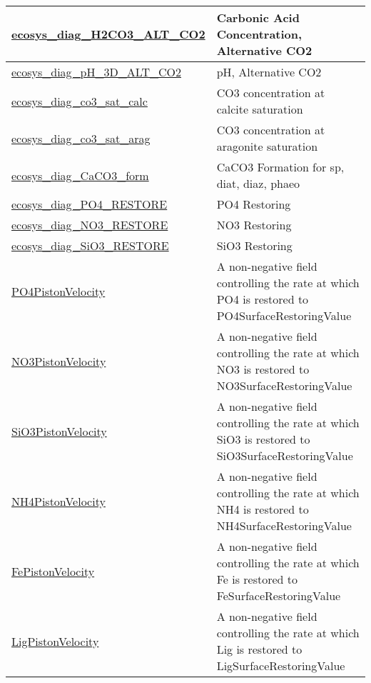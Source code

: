 {\begin{center}
\begin{longtable}{| p{2.0in} | p{4.0in} |}
    \hline
    \hyperref[subsec:var_sec_forcing_ecosys_diag_H2CO3_ALT_CO2]{ecosys\_diag\_H2CO3\_ALT\_\-CO2} & Carbonic Acid Concentration, Alternative CO2 \\
    \hline
    \hyperref[subsec:var_sec_forcing_ecosys_diag_pH_3D_ALT_CO2]{ecosys\_diag\_pH\_3D\_ALT\_\-CO2} & pH, Alternative CO2 \\
    \hline
    \hyperref[subsec:var_sec_forcing_ecosys_diag_co3_sat_calc]{ecosys\_diag\_co3\_sat\_calc} & CO3 concentration at calcite saturation \\
    \hline
    \hyperref[subsec:var_sec_forcing_ecosys_diag_co3_sat_arag]{ecosys\_diag\_co3\_sat\_arag} & CO3 concentration at aragonite saturation \\
    \hline
    \hyperref[subsec:var_sec_forcing_ecosys_diag_CaCO3_form]{ecosys\_diag\_CaCO3\_form} & CaCO3 Formation for sp, diat, diaz, phaeo \\
    \hline
    \hyperref[subsec:var_sec_forcing_ecosys_diag_PO4_RESTORE]{ecosys\_diag\_PO4\_RESTORE} & PO4 Restoring \\
    \hline
    \hyperref[subsec:var_sec_forcing_ecosys_diag_NO3_RESTORE]{ecosys\_diag\_NO3\_RESTORE} & NO3 Restoring \\
    \hline
    \hyperref[subsec:var_sec_forcing_ecosys_diag_SiO3_RESTORE]{ecosys\_diag\_SiO3\_RESTORE} & SiO3 Restoring \\
    \hline
    \hyperref[subsec:var_sec_forcing_PO4PistonVelocity]{PO4PistonVelocity} & A non-negative field controlling the rate at which PO4 is restored to PO4SurfaceRestoringValue \\
    \hline
    \hyperref[subsec:var_sec_forcing_NO3PistonVelocity]{NO3PistonVelocity} & A non-negative field controlling the rate at which NO3 is restored to NO3SurfaceRestoringValue \\
    \hline
    \hyperref[subsec:var_sec_forcing_SiO3PistonVelocity]{SiO3PistonVelocity} & A non-negative field controlling the rate at which SiO3 is restored to SiO3SurfaceRestoringValue \\
    \hline
    \hyperref[subsec:var_sec_forcing_NH4PistonVelocity]{NH4PistonVelocity} & A non-negative field controlling the rate at which NH4 is restored to NH4SurfaceRestoringValue \\
    \hline
    \hyperref[subsec:var_sec_forcing_FePistonVelocity]{FePistonVelocity} & A non-negative field controlling the rate at which Fe is restored to FeSurfaceRestoringValue \\
    \hline
    \hyperref[subsec:var_sec_forcing_LigPistonVelocity]{LigPistonVelocity} & A non-negative field controlling the rate at which Lig is restored to LigSurfaceRestoringValue \\

\end{longtable}
\end{center}}
